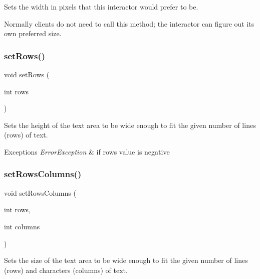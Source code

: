 Sets the width in pixels that this interactor would prefer to be. 

Normally clients do not need to call this method; the interactor can figure out its own preferred size. \mbox{\label{classsgl_1_1GTextArea_a508bbe326657af6d3add84deb4595989}} 
\subsubsection{\texorpdfstring{set\+Rows()}{setRows()}}
{\footnotesize\ttfamily void set\+Rows (\begin{DoxyParamCaption}\item[{int}]{rows }\end{DoxyParamCaption})\hspace{0.3cm}{\ttfamily [virtual]}}



Sets the height of the text area to be wide enough to fit the given number of lines (rows) of text. 


\begin{DoxyExceptions}{Exceptions}
{\em Error\+Exception} & if rows value is negative \\
\hline
\end{DoxyExceptions}
\mbox{\label{classsgl_1_1GTextArea_a15142a18598662167760b35e58be90b1}} 
\subsubsection{\texorpdfstring{set\+Rows\+Columns()}{setRowsColumns()}}
{\footnotesize\ttfamily void set\+Rows\+Columns (\begin{DoxyParamCaption}\item[{int}]{rows,  }\item[{int}]{columns }\end{DoxyParamCaption})\hspace{0.3cm}{\ttfamily [virtual]}}



Sets the size of the text area to be wide enough to fit the given number of lines (rows) and characters (columns) of text. 



